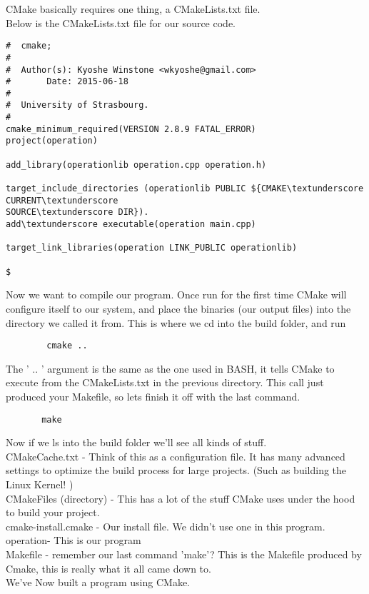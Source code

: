 \documentclass[11pt,utf8]{article}
\begin{document}
\begin{itemize}
CMake basically requires one thing, a CMakeLists.txt file.\\
Below is the CMakeLists.txt file for our source code.
\begin{lstlisting}
#  cmake; 
#
#  Author(s): Kyoshe Winstone <wkyoshe@gmail.com>
#       Date: 2015-06-18
#
#  University of Strasbourg.
#
cmake_minimum_required(VERSION 2.8.9 FATAL_ERROR)
project(operation)

add_library(operationlib operation.cpp operation.h)

target_include_directories (operationlib PUBLIC ${CMAKE\textunderscore CURRENT\textunderscore 
SOURCE\textunderscore DIR}).   
add\textunderscore executable(operation main.cpp)

target_link_libraries(operation LINK_PUBLIC operationlib)

$\end{lstlisting}

Now we want to compile our program. Once run for the first time CMake will configure itself to our system, and place the binaries (our output files) into the directory we called it from. This is where we cd into the build folder, and run
\begin{lstlisting}
        cmake ..
\end{lstlisting}
The ' .. ' argument is the same as the one used in BASH, it tells CMake to execute from the CMakeLists.txt in the previous directory. This call just produced your Makefile, so let\textquotesingle s finish it off with the last command.
\begin{lstlisting}
       make
 \end{lstlisting}      
       
Now if we ls into the build folder we'll see all kinds of stuff.\\

CMakeCache.txt - Think of this as a configuration file. It has many advanced settings to optimize the build process for large projects. (Such as building the Linux Kernel!  )\\
CMakeFiles (directory) - This has a lot of the stuff CMake uses under the hood to build your project.\\ 
cmake-install.cmake - Our install file. We didn't use one in this program.\\
operation-  This is our program\\
Makefile - remember our last command 'make'? This is the Makefile produced by Cmake, this is really what it all came down to.\\
We've Now built a program using CMake.


   \end{itemize}
\end{document}
